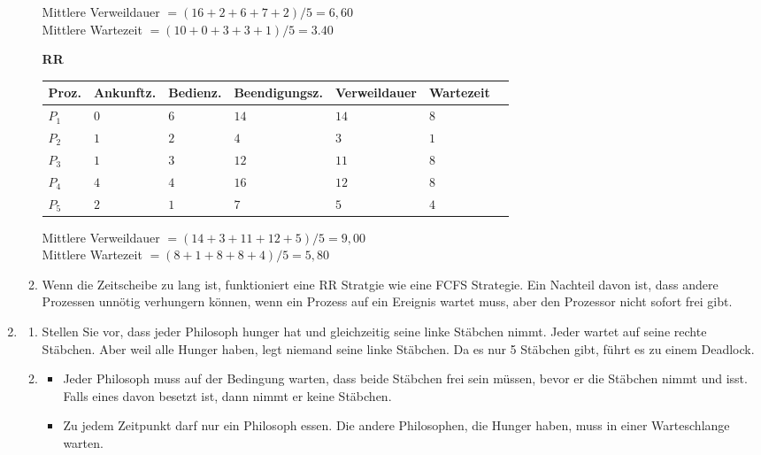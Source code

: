 \begin{enumerate}[label={Aufgabe H\arabic*},start=20]
\begin{enumerate}
				Mittlere Verweildauer $ = (16+2+6+7+2)/5 = 6,60$ \\
				Mittlere Wartezeit $ = (10+0+3+3+1)/5 = 3.40$

				\textbf{RR}
				\vspace{1em}
				\begin{center}
					\renewcommand*{\arraystretch}{1.2}
					\begin{tabular}{@{}lllllll@{}}
						\toprule
						{\small Proz.} & {\small Ankunftz.} & {\small Bedienz.} & {\small Beendigungsz.} & {\small Verweildauer} & {\small Wartezeit} \\
						\midrule
						$P_1$ & $0$ & $6$ & $14$ & $14$ & $8$ \\
						$P_2$ & $1$ & $2$ & $4$ & $3$ & $1$ \\
						$P_3$ & $1$ & $3$ & $12$ & $11$ & $8$ \\
						$P_4$ & $4$ & $4$ & $16$ & $12$ & $8$ \\
						$P_5$ & $2$ & $1$ & $7$ & $5$ & $4$ \\
						\bottomrule
					\end{tabular}
				\end{center}
				\vspace{1em}

				Mittlere Verweildauer $ = (14+3+11+12+5)/5 = 9,00$ \\
				Mittlere Wartezeit $ = (8+1+8+8+4)/5 = 5,80$

			\item Wenn die Zeitscheibe zu lang ist, funktioniert eine RR Stratgie wie eine FCFS Strategie. Ein Nachteil davon ist, dass andere Prozessen unnötig verhungern können, wenn ein Prozess auf ein Ereignis wartet muss, aber den Prozessor nicht sofort frei gibt.

		\end{enumerate}
	\item 
		\begin{enumerate}
			\item Stellen Sie vor, dass jeder Philosoph hunger hat und gleichzeitig seine linke Stäbchen nimmt. Jeder wartet auf seine rechte Stäbchen. Aber weil alle Hunger haben, legt niemand seine linke Stäbchen. Da es nur 5 Stäbchen gibt, führt es zu einem Deadlock. 
			\item 
				\begin{itemize}
					\item Jeder Philosoph muss auf der Bedingung warten, dass beide Stäbchen frei sein müssen, bevor er die Stäbchen nimmt und isst. Falls eines davon besetzt ist, dann nimmt er keine Stäbchen.
					\item Zu jedem Zeitpunkt darf nur ein Philosoph essen. Die andere Philosophen, die Hunger haben, muss in einer Warteschlange warten.


\end{itemize}
\end{enumerate}
\end{enumerate}
